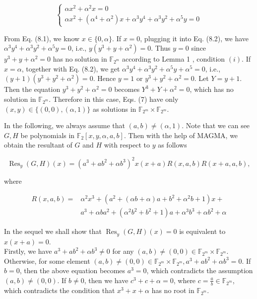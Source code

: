\documentclass[10pt]{article}
\begin{document}
\[
\left\{\begin{array}{l}
\alpha x^{2}+\alpha^{2} x=0  \tag{8.1}\\
\alpha x^{2}+\left(\alpha^{4}+\alpha^{2}\right) x+\alpha^{3} y^{4}+\alpha^{3} y^{2}+\alpha^{5} y=0
\end{array}\right.
\]

From Eq. (8.1), we know $x \in\{0, \alpha\}$. If $x=0$, plugging it into Eq. (8.2), we have $\alpha^{3} y^{4}+\alpha^{3} y^{2}+\alpha^{5} y=0$, i.e., $y\left(y^{3}+y+\alpha^{2}\right)=0$. Thus $y=0$ since $y^{3}+y+\alpha^{2}=0$ has no solution in $\mathbb{F}_{2^{m}}$ according to Lemma 1 , condition $(i)$. If $x=\alpha$, together with Eq. (8.2), we get $\alpha^{3} y^{4}+\alpha^{3} y^{2}+\alpha^{5} y+\alpha^{5}=0$, i.e., $(y+1)\left(y^{3}+y^{2}+\alpha^{2}\right)=0$. Hence $y=1$ or $y^{3}+y^{2}+\alpha^{2}=0$. Let $Y=y+1$. Then the equation $y^{3}+y^{2}+\alpha^{2}=0$ becomes $Y^{3}+Y+\alpha^{2}=0$, which has no solution in $\mathbb{F}_{2^{m}}$. Therefore in this case, Eqs. (7) have only $(x, y) \in\{(0,0),(\alpha, 1)\}$ as solutions in $\mathbb{F}_{2^{m}} \times \mathbb{F}_{2^{m}}$.

In the following, we always assume that $(a, b) \neq(\alpha, 1)$. Note that we can see $G, H$ be polynomials in $\mathbb{F}_{2}[x, y, \alpha, a, b]$. Then with the help of MAGMA, we obtain the resultant of $G$ and $H$ with respect to $y$ as follows


\begin{equation*}
\operatorname{Res}_{y}(G, H)(x)=\left(a^{3}+a b^{2}+\alpha b^{3}\right)^{2} x(x+a) R(x, a, b) R(x+a, a, b), \tag{9}
\end{equation*}


where

$$
\begin{aligned}
R(x, a, b)= & \alpha^{2} x^{3}+\left(a^{2}+(\alpha b+\alpha) a+b^{2}+\alpha^{2} b+1\right) x+ \\
& a^{3}+\alpha b a^{2}+\left(\alpha^{2} b^{2}+b^{2}+1\right) a+\alpha^{3} b^{3}+\alpha b^{2}+\alpha
\end{aligned}
$$

In the sequel we shall show that $\operatorname{Res}_{y}(G, H)(x)=0$ is equivalent to $x(x+a)=0$.\\
Firstly, we have $a^{3}+a b^{2}+\alpha b^{3} \neq 0$ for any $(a, b) \neq(0,0) \in \mathbb{F}_{2^{m}} \times \mathbb{F}_{2^{m}}$. Otherwise, for some element $(a, b) \neq(0,0) \in \mathbb{F}_{2^{m}} \times \mathbb{F}_{2^{m}}, a^{3}+a b^{2}+\alpha b^{3}=0$. If $b=0$, then the above equation becomes $a^{3}=0$, which contradicts the assumption $(a, b) \neq(0,0)$. If $b \neq 0$, then we have $c^{3}+c+\alpha=0$, where $c=\frac{a}{b} \in \mathbb{F}_{2^{m}}$, which contradicts the condition that $x^{3}+x+\alpha$ has no root in $\mathbb{F}_{2^{m}}$.
\end{document}
